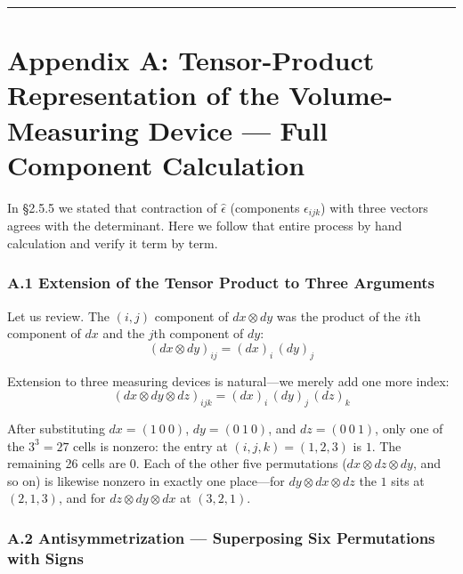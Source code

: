 \begin{center}\rule{0.5\linewidth}{0.5pt}\end{center}

\hypertarget{appendix-a-tensor-product-representation-of-the-volume-measuring-device-full-component-calculation}{%
\section{Appendix A: Tensor-Product Representation of the
Volume-Measuring Device --- Full Component
Calculation}\label{appendix-a-tensor-product-representation-of-the-volume-measuring-device-full-component-calculation}}

In §2.5.5 we stated that contraction of \(\widehat{\epsilon}\)
(components \(\epsilon_{ijk}\)) with three vectors agrees with the
determinant. Here we follow that entire process by hand calculation and
verify it term by term.

\hypertarget{a.1-extension-of-the-tensor-product-to-three-arguments}{%
\subsubsection{A.1 Extension of the Tensor Product to Three
Arguments}\label{a.1-extension-of-the-tensor-product-to-three-arguments}}

Let us review. The \((i,j)\) component of \(dx \otimes dy\) was the
product of the \(i\)th component of \(dx\) and the \(j\)th component of
\(dy\): \[(dx \otimes dy)_{ij} = (dx)_i\,(dy)_j\]

Extension to three measuring devices is natural---we merely add one more
index: \[(dx \otimes dy \otimes dz)_{ijk} = (dx)_i\,(dy)_j\,(dz)_k\]

After substituting \(dx=(1\ 0\ 0)\), \(dy=(0\ 1\ 0)\), and
\(dz=(0\ 0\ 1)\), only one of the \(3^3=27\) cells is nonzero: the entry
at \((i,j,k)=(1,2,3)\) is \(1\). The remaining 26 cells are \(0\). Each
of the other five permutations (\(dx \otimes dz \otimes dy\), and so on)
is likewise nonzero in exactly one place---for
\(dy \otimes dx \otimes dz\) the \(1\) sits at \((2,1,3)\), and for
\(dz \otimes dy \otimes dx\) at \((3,2,1)\).

\hypertarget{a.2-antisymmetrization-superposing-six-permutations-with-signs}{%
\subsubsection{A.2 Antisymmetrization --- Superposing Six Permutations
with
Signs}\label{a.2-antisymmetrization-superposing-six-permutations-with-signs}}

